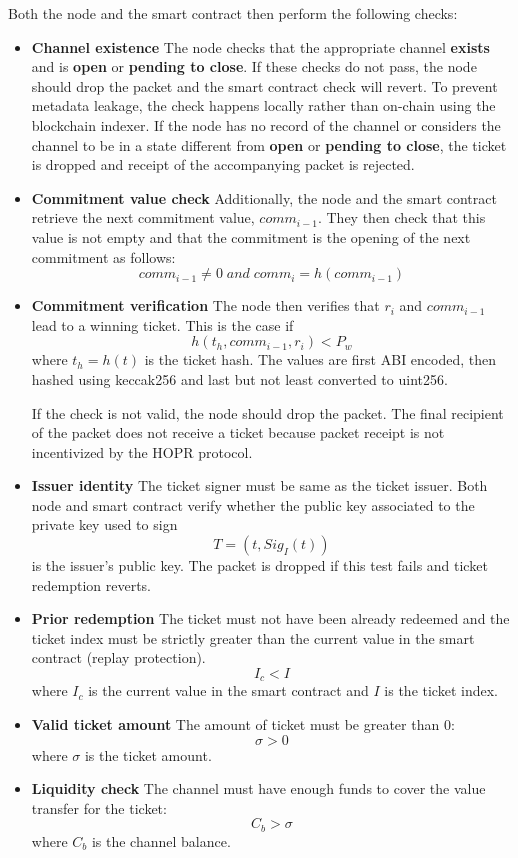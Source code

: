 Both the node and the smart contract then perform the following checks:

\begin{itemize}
      \item
            \textbf{Channel existence} The node checks that the appropriate channel \textbf{exists} and is \textbf{open} or \textbf{pending to close}. If these checks do not pass, the node should drop the packet and the smart contract check will revert. To prevent metadata leakage, the check happens locally rather than on-chain using the blockchain indexer. If the node has no record of the channel or considers the channel to be in a state different from \textbf{open} or \textbf{pending to close}, the ticket is dropped and receipt of the accompanying packet is rejected.
      \item
            \textbf{Commitment value check} Additionally, the node and the smart contract retrieve the next commitment value, $comm_{i-1}$. They then check that this value is not empty and that the commitment is the opening of the next commitment as follows: $$ comm_{i-1} \neq 0 \; and \; comm_{i}=h(comm_{i-1})$$
      \item
            \textbf{Commitment verification} The node then verifies that $r_i$ and $comm_{i-1}$ lead to a winning ticket. This is the case if $$h(t_h, comm_{i-1}, r_i) <P_w$$ where $t_h=h(t)$ is the ticket hash. The values are first ABI encoded, then hashed using keccak256 and last but not least converted to uint256.

            If the check is not valid, the node should drop the packet.
            The final recipient of the packet does not receive a ticket because packet receipt is not incentivized by the HOPR protocol.
      \item
            \textbf{Issuer identity} The ticket signer must be same as the ticket issuer. Both node and smart contract verify whether the public key associated to the private key used to sign $$T= (t, Sig_I(t))$$ is the issuer's public key. The packet is dropped if this test fails and ticket redemption reverts.
      \item
            \textbf{Prior redemption} The ticket must not have been already redeemed and the ticket index must be strictly greater than the current value in the smart contract (replay protection).
            $$I_c <I$$ where $I_c$ is the current value in the smart contract and $I$ is the ticket index.
      \item
            \textbf{Valid ticket amount} The amount of ticket must be greater than 0: $$\sigma>0$$ where $\sigma$ is the ticket amount.
      \item
            \textbf{Liquidity check} The channel must have enough funds to cover the value transfer for the ticket: $$ C_b>\sigma$$ where $C_b$ is the channel balance.
\end{itemize}

